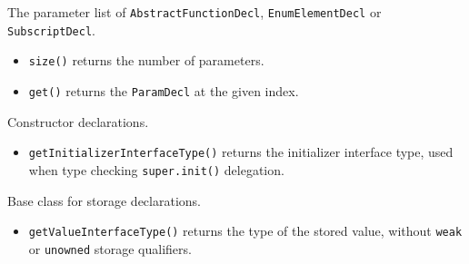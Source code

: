 \documentclass[../generics]{subfiles}
\begin{document}
The parameter list of \texttt{AbstractFunctionDecl}, \texttt{EnumElementDecl} or \texttt{SubscriptDecl}.
\begin{itemize}
\item \texttt{size()} returns the number of parameters.
\item \texttt{get()} returns the \texttt{ParamDecl} at the given index.
\end{itemize}

Constructor declarations.
\begin{itemize}
\item \texttt{getInitializerInterfaceType()} returns the initializer interface type, used when type checking \texttt{super.init()} delegation.
\end{itemize}

Base class for storage declarations.
\begin{itemize}
\item \texttt{getValueInterfaceType()} returns the type of the stored value, without \texttt{weak} or \texttt{unowned} storage qualifiers.
\end{itemize}
\end{document}
